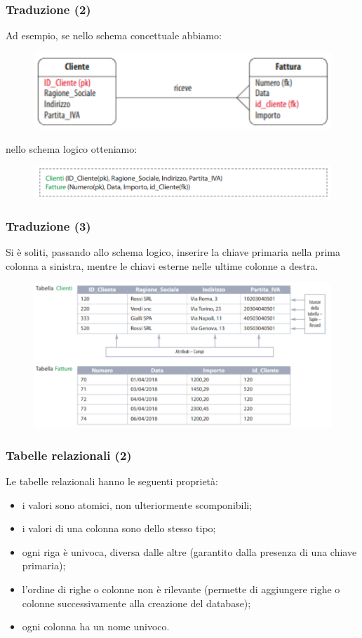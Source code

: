 \documentclass[]{beamer}
\begin{document}
\begin{frame}
\frametitle{Traduzione (2)}
Ad esempio, se nello schema concettuale abbiamo:
\begin{figure}
  \includegraphics[width=.7\columnwidth]{img/ristrutturazione8.png}
\end{figure}
nello schema logico otteniamo:
\begin{figure}
  \includegraphics[width=.9\columnwidth]{img/ristrutturazione9.png}
\end{figure}
\end{frame}

\begin{frame}
\frametitle{Traduzione (3)}
Si è soliti, passando allo schema logico, inserire la chiave primaria nella prima colonna a sinistra, mentre le chiavi esterne nelle ultime colonne a destra.
\begin{figure}
  \includegraphics[width=.95\columnwidth]{img/ristrutturazione10.png}
\end{figure}
\end{frame}


\begin{frame}
\frametitle{Tabelle relazionali (2)}
Le tabelle relazionali hanno le seguenti proprietà:
\begin{itemize}
  \item i valori sono atomici, non ulteriormente scomponibili;\pause
  \item i valori di una colonna sono \alert<2>{dello stesso tipo};\pause
  \item \alert<3>{ogni riga è univoca}, diversa dalle altre (garantito dalla presenza di una chiave primaria);\pause
  \item l'ordine di righe o colonne non è rilevante (permette di aggiungere righe o colonne successivamente alla creazione del database);\pause
  \item ogni colonna ha un nome univoco.\pause
\end{itemize}
\end{frame}
\end{document}
